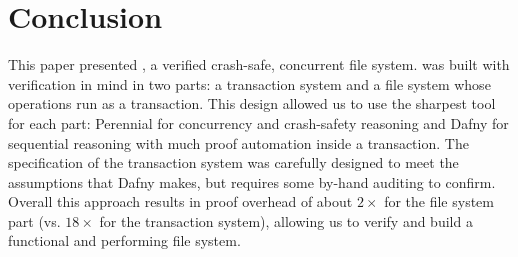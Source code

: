 \section{Conclusion}

This paper presented \sys, a verified crash-safe,
concurrent file system. \sys was built with verification in mind in
two parts: a transaction system and a file system whose operations run
as a transaction. This design allowed us to use the sharpest tool for
each part: Perennial for concurrency and crash-safety reasoning and
Dafny for sequential reasoning with much proof automation inside a
transaction.  The specification of the transaction system was
carefully designed to meet the assumptions that Dafny makes, but
requires some by-hand auditing to confirm.  Overall this approach
results in proof overhead of about $2\times$ for the file system part
(vs. $18\times$ for the transaction system), allowing us to verify and
build a functional and performing file system.

